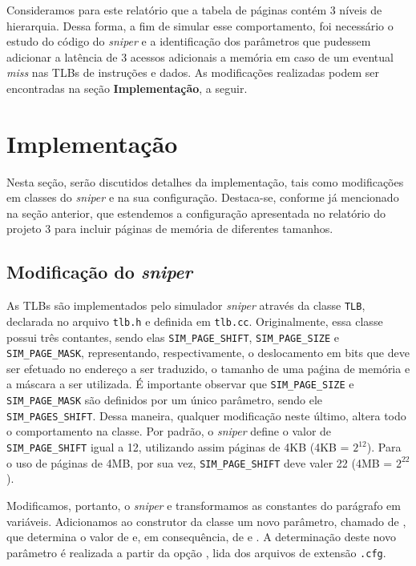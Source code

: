 \documentclass[12pt]{article}
\begin{document}
Consideramos para este relatório que a tabela de páginas contém 3 níveis de
hierarquia. Dessa forma, a fim de simular esse comportamento, foi necessário
o estudo do código do \textit{sniper} e a identificação dos parâmetros que
pudessem adicionar a latência de 3 acessos adicionais a memória em caso de um
eventual \textit{miss} nas TLBs de instruções e dados. As modificações
realizadas podem ser encontradas na seção \textbf{Implementação}, a seguir.

\section {Implementação}

Nesta seção, serão discutidos detalhes da implementação, tais como modificações
em classes do \textit{sniper} e na sua configuração. Destaca-se, conforme já
mencionado na seção anterior, que estendemos a configuração apresentada no
relatório do projeto 3 \cite{relatorio3} para incluir páginas de memória de
diferentes tamanhos.

\subsection{Modificação do \textit{sniper}}

As TLBs são implementados pelo simulador \textit{sniper} através da classe
\texttt{TLB}, declarada no arquivo \texttt{tlb.h} e definida em \texttt{tlb.cc}.
Originalmente, essa classe possui três contantes, sendo elas
\texttt{SIM\_PAGE\_SHIFT}, \texttt{SIM\_PAGE\_SIZE} e \texttt{SIM\_PAGE\_MASK},
representando, respectivamente, o deslocamento em bits que deve ser efetuado no
endereço a ser traduzido, o tamanho de uma paǵina de memória e a máscara a ser
utilizada. É importante observar que \texttt{SIM\_PAGE\_SIZE} e
\texttt{SIM\_PAGE\_MASK} são definidos por um único parâmetro, sendo ele
\texttt{SIM\_PAGES\_SHIFT}. Dessa maneira, qualquer modificação neste último,
altera todo o comportamento na classe. Por padrão, o \textit{sniper} define o
valor de \texttt{SIM\_PAGE\_SHIFT} igual a 12, utilizando
assim páginas de 4KB (4KB = \(2^{12}\)). Para o uso de páginas de 4MB, por sua
vez,  \texttt{SIM\_PAGE\_SHIFT} deve valer 22 (4MB = \(2^{22}\)).

Modificamos, portanto, o \textit{sniper} e transformamos as constantes do
parágrafo em variáveis. Adicionamos ao construtor da classe um novo parâmetro,
chamado de , que determina o valor de
 e, em consequência, de  e
. A determinação deste novo parâmetro é realizada a partir
da opção , lida dos arquivos de extensão \texttt{.cfg}.
\end{document}
